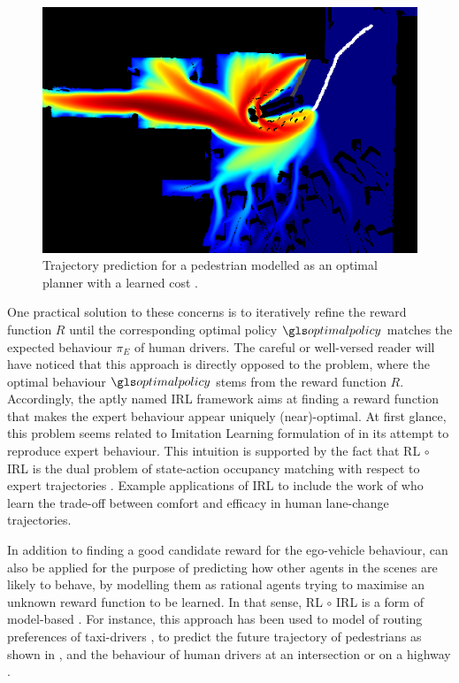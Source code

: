 \begin{figure}[ht]
	\centering
	\includegraphics[width=0.6\linewidth]{img/pedestrian}
	\caption{Trajectory prediction for a pedestrian modelled as an optimal planner with a learned cost \citep{Ziebart2009}.}
	\label{fig:irl-pedestrian}
\end{figure}


One practical solution to these concerns is to iteratively refine the reward function $R$ until the corresponding optimal policy $\optimalpolicy$ matches the expected behaviour $\pi_E$ of human drivers. The careful or well-versed reader will have noticed that this approach is directly opposed to the  problem, where the optimal behaviour $\optimalpolicy$ stems from the reward function $R$. Accordingly, the aptly named \gls{IRL} framework aims at finding a reward function that makes the expert behaviour appear uniquely (near)-optimal. At first glance, this problem seems related to Imitation Learning formulation of  in its attempt to reproduce expert behaviour. This intuition is supported by the fact that \gls{RL} $\circ$ \gls{IRL} is the dual problem of state-action occupancy matching with respect to expert trajectories \citep{Ho2016}. Example applications of \gls{IRL} to  include the work of \citet{Kuderer2015} who learn the trade-off between comfort and efficacy in human lane-change trajectories. 

In addition to finding a good candidate reward for the ego-vehicle behaviour,  can also be applied for the purpose of predicting how other agents in the scenes are likely to behave, by modelling them as rational agents trying to maximise an unknown reward function to be learned. In that sense, \gls{RL} $\circ$ \gls{IRL} is a form of \gls{model-based} .
For instance, this approach has been used to model of routing preferences of taxi-drivers \citep{Ziebart2008}, to predict the future trajectory of pedestrians \citep{Ziebart2009} as shown in , and the behaviour of human drivers at an intersection \citep{Sun2019} or on a highway \citep{Sadigh2016}.


